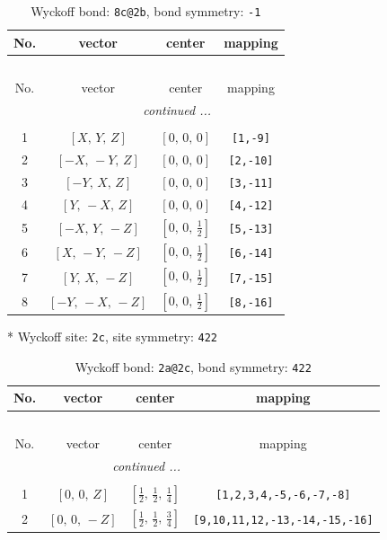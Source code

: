 \documentclass[fleqn,8pt]{jsarticle}
\begin{document}
\renewcommand{\arraystretch}{1.2}
\begin{longtable}{cccc}
\caption{Wyckoff bond: {\tt 8c@2b}, bond symmetry: {\tt -1}}
 \\
 \hline \hline
No. & vector & center & mapping \\ \hline \endfirsthead

\multicolumn{3}{l}{\tablename\ \thetable{}} \\
 \hline \hline
No. & vector & center & mapping \\ \hline \endhead

 \hline \hline
\multicolumn{3}{r}{\footnotesize\it continued ...} \\ \endfoot

 \hline \hline
\multicolumn{3}{r}{} \\ \endlastfoot

1 & $\left[ X,\, Y,\, Z \right]$ & $\left[ 0,\, 0,\, 0 \right]$ & {\tt [1,-9]} \\ \hline
2 & $\left[ - X,\, - Y,\, Z \right]$ & $\left[ 0,\, 0,\, 0 \right]$ & {\tt [2,-10]} \\ \hline
3 & $\left[ - Y,\, X,\, Z \right]$ & $\left[ 0,\, 0,\, 0 \right]$ & {\tt [3,-11]} \\ \hline
4 & $\left[ Y,\, - X,\, Z \right]$ & $\left[ 0,\, 0,\, 0 \right]$ & {\tt [4,-12]} \\ \hline
5 & $\left[ - X,\, Y,\, - Z \right]$ & $\left[ 0,\, 0,\, \frac{1}{2} \right]$ & {\tt [5,-13]} \\ \hline
6 & $\left[ X,\, - Y,\, - Z \right]$ & $\left[ 0,\, 0,\, \frac{1}{2} \right]$ & {\tt [6,-14]} \\ \hline
7 & $\left[ Y,\, X,\, - Z \right]$ & $\left[ 0,\, 0,\, \frac{1}{2} \right]$ & {\tt [7,-15]} \\ \hline
8 & $\left[ - Y,\, - X,\, - Z \right]$ & $\left[ 0,\, 0,\, \frac{1}{2} \right]$ & {\tt [8,-16]} \\
\end{longtable}
* Wyckoff site: {\tt 2c}, site symmetry: {\tt 422}
\renewcommand{\arraystretch}{1.2}
\begin{longtable}{cccc}
\caption{Wyckoff bond: {\tt 2a@2c}, bond symmetry: {\tt 422}}
 \\
 \hline \hline
No. & vector & center & mapping \\ \hline \endfirsthead

\multicolumn{3}{l}{\tablename\ \thetable{}} \\
 \hline \hline
No. & vector & center & mapping \\ \hline \endhead

 \hline \hline
\multicolumn{3}{r}{\footnotesize\it continued ...} \\ \endfoot

 \hline \hline
\multicolumn{3}{r}{} \\ \endlastfoot

1 & $\left[ 0,\, 0,\, Z \right]$ & $\left[ \frac{1}{2},\, \frac{1}{2},\, \frac{1}{4} \right]$ & {\tt [1,2,3,4,-5,-6,-7,-8]} \\ \hline
2 & $\left[ 0,\, 0,\, - Z \right]$ & $\left[ \frac{1}{2},\, \frac{1}{2},\, \frac{3}{4} \right]$ & {\tt [9,10,11,12,-13,-14,-15,-16]} \\
\end{longtable}
\end{document}
